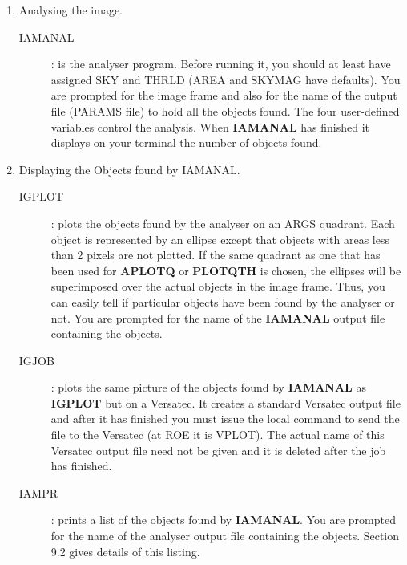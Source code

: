 \begin{enumerate}
\item Analysing the image.
\begin{description}
\item [IAMANAL]:
is the analyser program.
Before running it, you should at least have assigned SKY and THRLD (AREA and
SKYMAG have defaults).
You are prompted for the image frame and also for the name of the output file
(PARAMS file) to hold all the objects found.
The four user-defined variables control the analysis.
When {\bf IAMANAL} has finished it displays on your terminal the number of
objects found.
\end{description}
\item Displaying the Objects found by IAMANAL.
\begin{description}
\item [IGPLOT]:
plots the objects found by the analyser on an ARGS quadrant.
Each object is represented by an ellipse except that objects with areas less
than 2 pixels are not plotted.
If the same quadrant as one that has been used for {\bf APLOTQ} or
{\bf PLOTQTH} is chosen, the ellipses will be superimposed over the actual
objects in the image frame.
Thus, you can easily tell if particular objects have been found by the analyser
or not.
You are prompted for the name of the {\bf IAMANAL} output file containing the
objects.
\item [IGJOB]:
plots the same picture of the objects found by {\bf IAMANAL} as {\bf IGPLOT}
but on a Versatec.
It creates a standard Versatec output file and after it has finished you must
issue the local command to send the file to the Versatec (at ROE it is VPLOT).
The actual name of this Versatec output file need not be given and it is
deleted after the job has finished.
\item [IAMPR]:
prints a list of the objects found by {\bf IAMANAL}.
You are prompted for the name of the analyser output file containing the
objects.
Section 9.2 gives details of this listing.
\end{description}
\end{enumerate}
